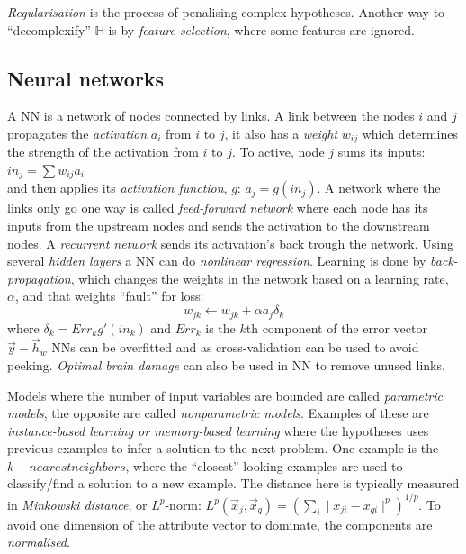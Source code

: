 \documentclass[11pt, letterpaper]{report}
\numberwithin{equation}{section}
\begin{document}
\emph{Regularisation} is the process of penalising complex hypotheses. Another
way to ``decomplexify'' $\mathbb{H}$ is by \emph{feature selection}, where some
features are ignored.

\subsection*{Neural networks}
A NN is a network of nodes connected by links. A link between the nodes $i$ and
$j$ propagates the \emph{activation} $a_i$ from $i$ to $j$, it also has a
\emph{weight} $w_{ij}$ which determines the strength of the activation from $i$
to $j$. To active, node $j$ sums its inputs: $in_j = \sum w_{ij}a_i$ \\ and then
applies its \emph{activation function}, $g$: $a_j = g(in_j)$. A network where
the links only go one way is called \emph{feed-forward network} where each node
has its inputs from the upstream nodes and sends the activation to the
downstream nodes. A \emph{recurrent network} sends its activation's back trough
the network. Using several \emph{hidden layers} a NN can do \emph{nonlinear
  regression}. Learning is done by \emph{back-propagation}, which changes the
weights in the network based on a learning rate, $\alpha$, and that weights
``fault'' for loss:
\setcounter{equation}{10}
\begin{equation}
  \label{eq:backprop}
  w_{jk} \leftarrow w_{jk} + \alpha a_j \delta_k
\end{equation}
where $\delta_k = Err_k g'(in_k)$ and $Err_k$ is the $k$th component of the
error vector $\vec{y}-\vec{h}_w$
NNs can be overfitted and as cross-validation can be used to avoid peeking.
\emph{Optimal brain damage} can also be used in NN to remove unused links.

Models where the number of input variables are bounded are called
\emph{parametric models}, the opposite are called \emph{nonparametric models}.
Examples of these are \emph{instance-based learning or memory-based learning}
where the hypotheses uses previous examples to infer a solution to the next
problem. One example is the $k-nearest neighbors$, where the ``closest'' looking
examples are used to classify/find a solution to a new example. The distance
here is typically measured in \emph{Minkowski distance}, or $L^p$-norm:
$L^p(\vec{x}_j,\vec{x}_q) = (\sum_i \mid x_{ji} - x_{qi} \mid^p)^{1/p}$.
To avoid one dimension of the attribute vector to dominate, the components are \emph{normalised}.

\setcounter{section}{20}
\end{document}
